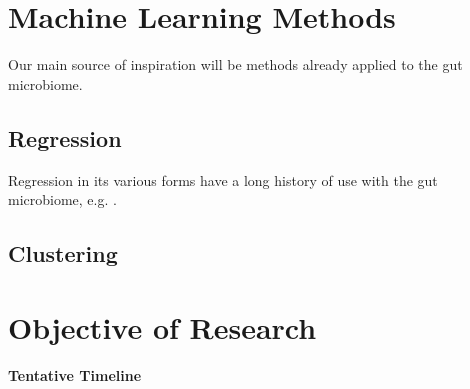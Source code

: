 \documentclass{article}
\begin{document}
\begin{multicols}{2}
\section{Machine Learning Methods} 
Our main source of inspiration will be methods already applied to the gut microbiome. 
\subsection{Regression}
Regression in its various forms have a long history of use with the gut microbiome, e.g. . 
\subsection{Clustering}

\section{Objective of Research}
\textbf{Tentative Timeline}
\end{multicols}


\end{document}
